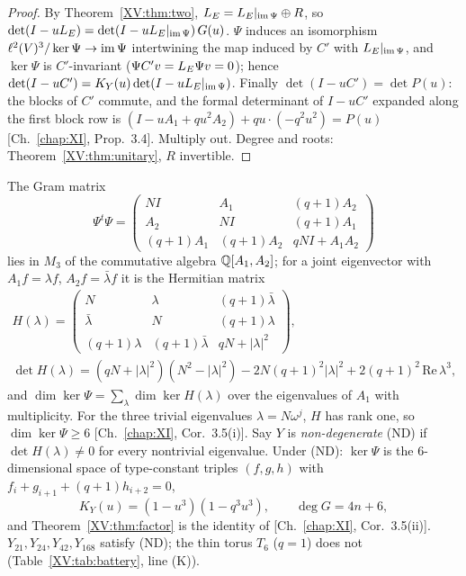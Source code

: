 \begin{proof}
By Theorem~\ref{XV:thm:two}, $L_E=L_E|_{\operatorname{im}\Psi}\oplus R$, so $\det(I-uL_E)=\det(I-uL_E|_{\operatorname{im}\Psi})
\,G(u)$. $\Psi$ induces an isomorphism $\ell^{2}(V)^{3}/\ker\Psi\to\operatorname{im}\Psi$ intertwining the
map induced by $C'$ with $L_E|_{\operatorname{im}\Psi}$, and $\ker\Psi$ is $C'$-invariant ($\Psi C'v=L_E\Psi v=0$);
hence $\det(I-uC')=K_Y(u)\det(I-uL_E|_{\operatorname{im}\Psi})$. Finally $\det(I-uC')=\det P(u)$: the blocks
of $C'$ commute, and the formal determinant of $I-uC'$ expanded along the first block row is
$(I-uA_1+qu^{2}A_2)+qu\cdot(-q^{2}u^{2})=P(u)$ [Ch.~\ref{chap:XI}, Prop.~3.4]. Multiply out. Degree and
roots: Theorem~\ref{XV:thm:unitary}, $R$ invertible.
\end{proof}

\begin{proposition}\label{XV:prop:kernel}
The Gram matrix
\[
\Psi^{t}\Psi=\begin{pmatrix}NI&A_1&(q{+}1)A_2\\A_2&NI&(q{+}1)A_1\\(q{+}1)A_1&(q{+}1)A_2&qNI+A_1A_2\end{pmatrix}
\]
lies in $M_3$ of the commutative algebra $\mathbb{Q}[A_1,A_2]$; for a joint eigenvector with
$A_1f=\lambda f$, $A_2f=\bar\lambda f$ it is the Hermitian matrix
\begin{gather*}
H(\lambda)=\begin{pmatrix}N&\lambda&(q{+}1)\bar\lambda\\\bar\lambda&N&(q{+}1)\lambda\\
(q{+}1)\lambda&(q{+}1)\bar\lambda&qN+|\lambda|^{2}\end{pmatrix},\\
\det H(\lambda)=(qN+|\lambda|^{2})(N^{2}-|\lambda|^{2})-2N(q{+}1)^{2}|\lambda|^{2}+2(q{+}1)^{2}\,\mathrm{Re}\,\lambda^{3},
\end{gather*}
and $\dim\ker\Psi=\sum_\lambda\dim\ker H(\lambda)$ over the eigenvalues of $A_1$ with
multiplicity. For the three trivial eigenvalues $\lambda=N\omega^{j}$, $H$ has rank one, so
$\dim\ker\Psi\ge6$ [Ch.~\ref{chap:XI}, Cor.~3.5(i)]. Say $Y$ is \emph{non-degenerate} (ND) if $\det H(\lambda)\ne0$
for every nontrivial eigenvalue. Under (ND): $\ker\Psi$ is the $6$-dimensional space of
type-constant triples $(f,g,h)$ with $f_i+g_{i+1}+(q{+}1)h_{i+2}=0$,
\[
K_Y(u)=(1-u^{3})(1-q^{3}u^{3}),\qquad \deg G=4n+6 ,
\]
and Theorem~\ref{XV:thm:factor} is the identity of {\rm[Ch.~\ref{chap:XI}, Cor.~3.5(ii)]}. $Y_{21},Y_{24},Y_{42},
Y_{168}$ satisfy (ND); the thin torus $T_6$ ($q=1$) does not (Table~\ref{XV:tab:battery}, line (K)).
\end{proposition}

